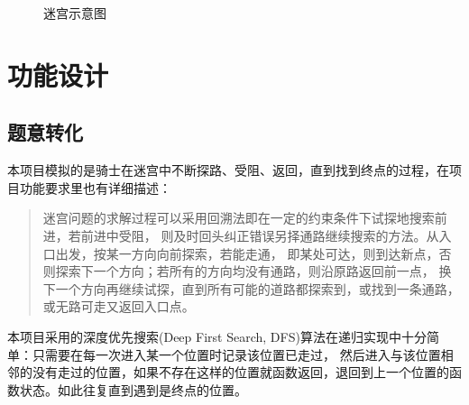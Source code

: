 \begin{figure}[H]
    \caption{迷宫示意图}
\end{figure}

\chapter{功能设计}

\section{题意转化}

本项目模拟的是骑士在迷宫中不断探路、受阻、返回，直到找到终点的过程，在项目功能要求里也有详细描述：

\begin{quote}
    \kaishu
    迷宫问题的求解过程可以采用回溯法即在一定的约束条件下试探地搜索前进，若前进中受阻，%
    则及时回头纠正错误另择通路继续搜索的方法。从入口出发，按某一方向向前探索，若能走通，%
    即某处可达，则到达新点，否则探索下一个方向；若所有的方向均没有通路，则沿原路返回前一点，%
    换下一个方向再继续试探，直到所有可能的道路都探索到，或找到一条通路，或无路可走又返回入口点。
\end{quote}

本项目采用的{\kaishu 深度优先搜索(Deep First Search, DFS)}算法在递归实现中十分简单：只需要在每一次进入某一个位置时记录该位置已走过，%
然后进入与该位置相邻的没有走过的位置，如果不存在这样的位置就函数返回，退回到上一个位置的函数状态。如此往复直到遇到是终点的位置。

